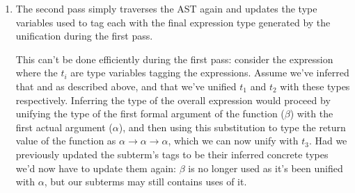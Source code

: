 \documentclass[dissertation.tex]{subfiles}
\begin{document}
{{{\begin{enumerate}
{                After a pattern binding declaration has been fully traversed, types are generated for all the variable
                names bound by the patterns. This involves adding explicit quantifiers and constraints to the simple
                type inferred for the top-level expression on the right-hand-side of the binding. All free type
                variables in the simple type are added as universally quantified variables, and any constraints
                involving type variables that are free in the simple type are added as the qualifiers to the type.


            }
            \item
            {

                The second pass simply traverses the AST again and updates the type variables used to tag each with the
                final expression type generated by the unification during the first pass.
                
                This can't be done efficiently during the first pass: consider the expression  where the \(t_i\) are type variables tagging the expressions. Assume we've
                inferred that  and \haskell{(+) ::
                #\(\beta\rightarrow\beta\rightarrow\beta\)#} as described above, and that we've unified \(t_1\) and
                \(t_2\) with these types respectively. Inferring the type of the overall expression would proceed by
                unifying the type of the first formal argument of the function (\(\beta\)) with the first actual
                argument (\(\alpha\)), and then using this substitution to type the return value of the function as
                \(\alpha\rightarrow\alpha\rightarrow\alpha\), which we can now unify with \(t_3\). Had we previously
                updated the subterm's tags to be their inferred concrete types we'd now have to update them again:
                \(\beta\) is no longer used as it's been unified with \(\alpha\), but our subterms may still contains
                uses of it.

}
\end{enumerate}}}}
\end{document}
